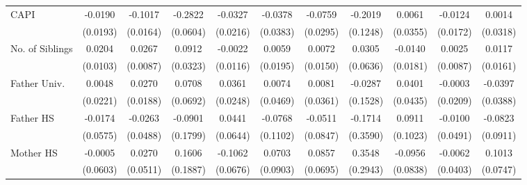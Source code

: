 \begin{table}[htbp]
\begin{tabular}{l*{10}{c}}
\addlinespace
CAPI        &     -0.0190         &     -0.1017\sym{***}&     -0.2822\sym{***}&     -0.0327         &     -0.0378         &     -0.0759\sym{*}  &     -0.2019         &      0.0061         &     -0.0124         &      0.0014         \\
            &    (0.0193)         &    (0.0164)         &    (0.0604)         &    (0.0216)         &    (0.0383)         &    (0.0295)         &    (0.1248)         &    (0.0355)         &    (0.0172)         &    (0.0318)         \\
\addlinespace
No. of Siblings&      0.0204\sym{*}  &      0.0267\sym{**} &      0.0912\sym{**} &     -0.0022         &      0.0059         &      0.0072         &      0.0305         &     -0.0140         &      0.0025         &      0.0117         \\
            &    (0.0103)         &    (0.0087)         &    (0.0323)         &    (0.0116)         &    (0.0195)         &    (0.0150)         &    (0.0636)         &    (0.0181)         &    (0.0087)         &    (0.0161)         \\
\addlinespace
Father Univ.&      0.0048         &      0.0270         &      0.0708         &      0.0361         &      0.0074         &      0.0081         &     -0.0287         &      0.0401         &     -0.0003         &     -0.0397         \\
            &    (0.0221)         &    (0.0188)         &    (0.0692)         &    (0.0248)         &    (0.0469)         &    (0.0361)         &    (0.1528)         &    (0.0435)         &    (0.0209)         &    (0.0388)         \\
\addlinespace
Father HS   &     -0.0174         &     -0.0263         &     -0.0901         &      0.0441         &     -0.0768         &     -0.0511         &     -0.1714         &      0.0911         &     -0.0100         &     -0.0823         \\
            &    (0.0575)         &    (0.0488)         &    (0.1799)         &    (0.0644)         &    (0.1102)         &    (0.0847)         &    (0.3590)         &    (0.1023)         &    (0.0491)         &    (0.0911)         \\
\addlinespace
Mother HS   &     -0.0005         &      0.0270         &      0.1606         &     -0.1062         &      0.0703         &      0.0857         &      0.3548         &     -0.0956         &     -0.0062         &      0.1013         \\
            &    (0.0603)         &    (0.0511)         &    (0.1887)         &    (0.0676)         &    (0.0903)         &    (0.0695)         &    (0.2943)         &    (0.0838)         &    (0.0403)         &    (0.0747)         \\

\end{tabular}
\end{table}
